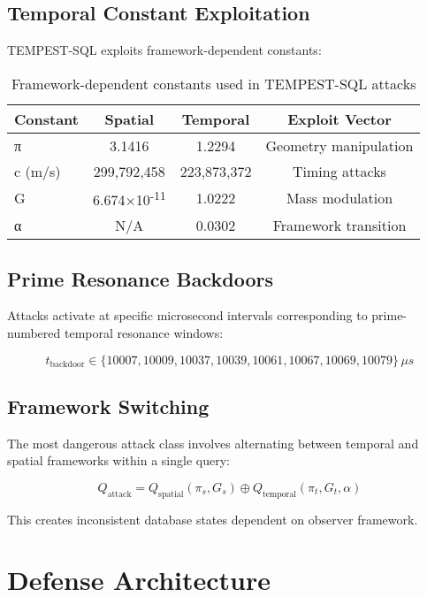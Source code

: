 \documentclass[11pt,a4paper]{article}
\begin{document}
\subsection{Temporal Constant Exploitation}

TEMPEST-SQL exploits framework-dependent constants:

\begin{table}[h]
\centering
\begin{tabular}{|l|c|c|c|}
\hline
\textbf{Constant} & \textbf{Spatial} & \textbf{Temporal} & \textbf{Exploit Vector} \\
\hline
π & 3.1416 & 1.2294 & Geometry manipulation \\
c (m/s) & 299,792,458 & 223,873,372 & Timing attacks \\
G & 6.674×10\textsuperscript{-11} & 1.0222 & Mass modulation \\
α & N/A & 0.0302 & Framework transition \\
\hline
\end{tabular}
\caption{Framework-dependent constants used in TEMPEST-SQL attacks}
\end{table}

\subsection{Prime Resonance Backdoors}

Attacks activate at specific microsecond intervals corresponding to prime-numbered temporal resonance windows:

\begin{equation}
t_{\text{backdoor}} \in \{10007, 10009, 10037, 10039, 10061, 10067, 10069, 10079\} \, \mu s
\end{equation}

\subsection{Framework Switching}

The most dangerous attack class involves alternating between temporal and spatial frameworks within a single query:

\begin{equation}
Q_{\text{attack}} = Q_{\text{spatial}}(π_s, G_s) \oplus Q_{\text{temporal}}(π_t, G_t, α)
\end{equation}

This creates inconsistent database states dependent on observer framework.

\section{Defense Architecture}
\end{document}
